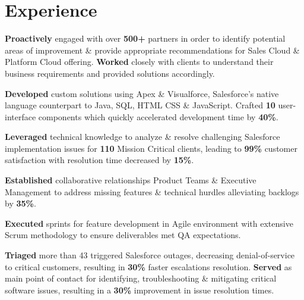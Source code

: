 \documentclass[]{prakhar-resume-version-2}
\begin{document}
\begin{minipage}[t]{0.66\textwidth} 


\section{Experience}
 \hspace{-4.5mm}
\begin{itemize}
\justifying
\small{
\item \textbf{Proactively} engaged with over \textbf{500+} partners in order to identify potential areas of improvement \& provide appropriate recommendations for Sales Cloud \& Platform Cloud offering. \textbf{Worked} closely with clients to understand their business requirements and provided solutions accordingly.
\vspace{-1.5mm}
\item \textbf{Developed} custom solutions using Apex \& Visualforce, Salesforce’s native language counterpart to Java, SQL, HTML CSS \& JavaScript. Crafted \textbf{10} user-interface components which quickly accelerated development time by \textbf{40\%}.
\item  \textbf{Leveraged} technical knowledge to analyze \& resolve challenging Salesforce implementation issues for \textbf{110} Mission Critical clients, leading to \textbf{99\%} customer satisfaction with resolution time decreased by \textbf{15\%}.
\vspace{-1.5mm}
 \item \textbf{Established} collaborative relationships Product Teams \& Executive Management to address missing features \& technical hurdles\; alleviating backlogs by \textbf{35\%}.
 \vspace{-1.5mm}
 \item \textbf{Executed} sprints for feature development in Agile environment with extensive Scrum methodology to ensure deliverables met QA expectations. 
 \vspace{-1.5mm}
 \item \textbf{Triaged} more than 43 triggered Salesforce outages, decreasing denial-of-service to critical customers, resulting in \textbf{30\%} faster escalations resolution. \textbf{Served} as main point of contact for identifying, troubleshooting \& mitigating critical software issues, resulting in a \textbf{30\%} improvement in issue resolution times. 
}
\end{itemize}
\end{minipage}
\end{document}

